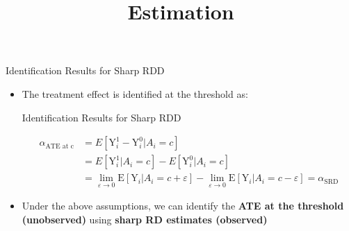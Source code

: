 \documentclass[dvipsnames,hyperref={pdfpagelabels=false}]{beamer}
\begin{document}
\begin{frame}{Identification Results for Sharp RDD}{}
	\begin{itemize}
		
		\item The treatment effect is identified at the threshold as:
		\vspace{0.2cm}
		\begin{block}{Identification Results for Sharp RDD}
			
			\begin{equation*}
			\begin{aligned}
			\alpha_{\text{ATE at c}}&=E[\mathrm{Y}^{1}_{i}-\mathrm{Y}^{0}_{i}|A_{i}=c]  \\
			&= E[\mathrm{Y}^{1}_{i}|A_{i}=c]-E[\mathrm{Y}^{0}_{i}|A_{i}=c]\\
			&=\lim_{\varepsilon\rightarrow 0}\mathrm{E}[\mathrm{Y}_{i}|A_i=c+\varepsilon] - \lim_{\varepsilon\rightarrow 0}\mathrm{E}[\mathrm{Y}_{i}|A_i=c-\varepsilon]  = \alpha_{\text{SRD}}
			\end{aligned}
			\end{equation*}
		\end{block}
		
		\vspace{0.2cm}
		\item Under the above assumptions, we can identify the \textbf{ATE at the threshold (unobserved)} using \textbf{sharp RD estimates (observed)}
		
		
		
		
		
	\end{itemize}
\end{frame}










\title[]  
{Estimation}


\author 
{}

\institute{}


\end{document}
